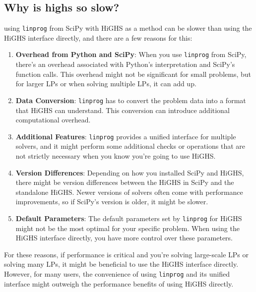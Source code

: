 \subsection{Why is highs so slow?}
using \texttt{linprog} from SciPy with HiGHS as a method can be slower than using the HiGHS interface directly, and there are a few reasons for this:

\begin{enumerate}
    \item \textbf{Overhead from Python and SciPy}: When you use \texttt{linprog} from SciPy,
          there's an overhead associated with Python's interpretation and SciPy's function calls.
          This overhead might not be significant for small problems, but for larger LPs or when solving multiple LPs, it can add up.

    \item \textbf{Data Conversion}: \texttt{linprog} has to convert the problem data
          into a format that HiGHS can understand. This conversion can introduce additional computational overhead.

    \item \textbf{Additional Features}: \texttt{linprog} provides a unified interface for
          multiple solvers, and it might perform some additional checks or operations that are not strictly necessary
          when you know you're going to use HiGHS.

    \item \textbf{Version Differences}: Depending on how you installed SciPy and HiGHS,
          there might be version differences between the HiGHS in SciPy and the standalone HiGHS.
          Newer versions of solvers often come with performance improvements, so if SciPy's version is older, it might be slower.

    \item \textbf{Default Parameters}: The default parameters set by \texttt{linprog} for HiGHS
          might not be the most optimal for your specific problem. When using the HiGHS interface directly,
          you have more control over these parameters.
\end{enumerate}

For these reasons, if performance is critical and you're solving large-scale LPs or solving many LPs, it might be beneficial to use
the HiGHS interface directly. However, for many users, the convenience of using
\texttt{linprog} and its unified interface might outweigh the performance benefits of using HiGHS directly.

